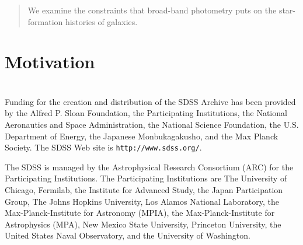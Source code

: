 \documentclass[10pt]{aastex}
\newcounter{address}
\begin{document}

\clearpage

\begin{abstract}
We examine the constraints that broad-band photometry puts on the
star-formation histories of galaxies. 
\end{abstract}


%
%

\section{Motivation}
\label{motivation}

\section{}
\label{sedfit}


\acknowledgments

Funding for the creation and distribution of the SDSS Archive has been
provided by the Alfred P. Sloan Foundation, the Participating
Institutions, the National Aeronautics and Space Administration, the
National Science Foundation, the U.S. Department of Energy, the
Japanese Monbukagakusho, and the Max Planck Society. The SDSS Web site
is {\tt http://www.sdss.org/}.

The SDSS is managed by the Astrophysical Research Consortium (ARC) for
the Participating Institutions. The Participating Institutions are The
University of Chicago, Fermilab, the Institute for Advanced Study, the
Japan Participation Group, The Johns Hopkins University, Los Alamos
National Laboratory, the Max-Planck-Institute for Astronomy (MPIA),
the Max-Planck-Institute for Astrophysics (MPA), New Mexico State
University, Princeton University, the United States Naval Observatory,
and the University of Washington.
 
\begin{thebibliography}{DUM}

\end{thebibliography}

\newpage

%


\end{document}
